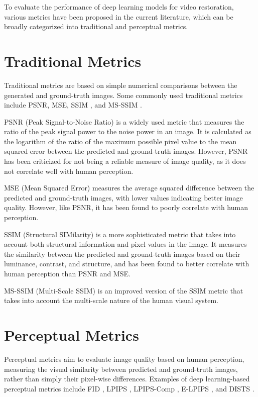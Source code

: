 \label{chap:Metrics}

To evaluate the performance of deep learning models for video restoration, various metrics have been proposed in the current literature, which can be broadly categorized into traditional and perceptual metrics.

\section{Traditional Metrics}
\label{sec:traditional-metrics}
Traditional metrics are based on simple numerical comparisons between the generated and ground-truth images. Some commonly used traditional metrics include PSNR, MSE, SSIM \cite{wang2004image}, and MS-SSIM \cite{wang2003multiscale}.

PSNR (Peak Signal-to-Noise Ratio) is a widely used metric that measures the ratio of the peak signal power to the noise power in an image. It is calculated as the logarithm of the ratio of the maximum possible pixel value to the mean squared error between the predicted and ground-truth images. However, PSNR has been criticized for not being a reliable measure of image quality, as it does not correlate well with human perception.

MSE (Mean Squared Error) measures the average squared difference between the predicted and ground-truth images, with lower values indicating better image quality. However, like PSNR, it has been found to poorly correlate with human perception.

SSIM (Structural SIMilarity) is a more sophisticated metric that takes into account both structural information and pixel values in the image. It measures the similarity between the predicted and ground-truth images based on their luminance, contrast, and structure, and has been found to better correlate with human perception than PSNR and MSE.

MS-SSIM (Multi-Scale SSIM) is an improved version of the SSIM metric that takes into account the multi-scale nature of the human visual system.

\section{Perceptual Metrics}
\label{sec:perceptual-metrics}
Perceptual metrics aim to evaluate image quality based on human perception, measuring the visual similarity between predicted and ground-truth images, rather than simply their pixel-wise differences. Examples of deep learning-based perceptual metrics include FID \cite{heusel2017gans}, LPIPS \cite{zhang2018unreasonable}, LPIPS-Comp \cite{patel2021saliency}, E-LPIPS \cite{kettunen2019lpips}, and DISTS \cite{ding2020image}.

